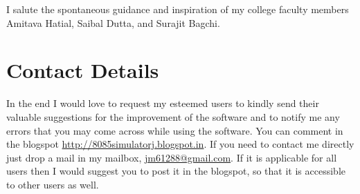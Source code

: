 I salute the spontaneous guidance and inspiration of my college faculty members Amitava Hatial, Saibal Dutta, and Surajit Bagchi.
 

\section*{Contact Details}
In the end I would love to request my esteemed  users to kindly send their valuable suggestions for the improvement of the software and to notify me any errors that you may come across while using the software. You can comment in the blogspot \url{http://8085simulatorj.blogspot.in}. If you need to contact me directly just drop a mail in my mailbox, \href{mailto:jm61288@gmail.com}{jm61288@gmail.com}. If it is applicable for all users then I would suggest you to post it in the blogspot, so that it is accessible to other users as well. 

{
\vspace{0.1\linewidth}
\raggedleft
{}\\
}